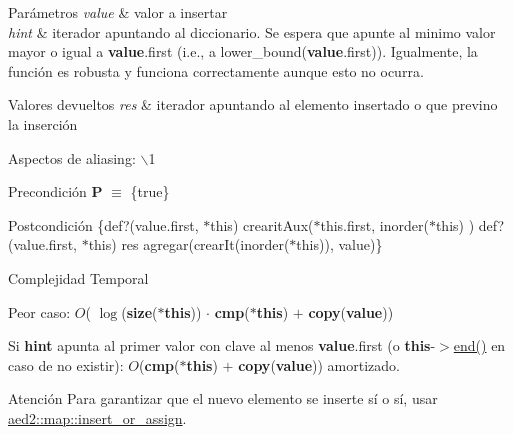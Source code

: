 \begin{DoxyParams}{\-Parámetros}
{\em value} & valor a insertar \\
\hline
{\em hint} & iterador apuntando al diccionario. \-Se espera que apunte al minimo valor mayor o igual a {\bfseries value}.first (i.\-e., a lower\-\_\-bound({\bfseries value}.first)). \-Igualmente, la función es robusta y funciona correctamente aunque esto no ocurra. \\
\hline
\end{DoxyParams}

\begin{DoxyRetVals}{\-Valores devueltos}
{\em res} & iterador apuntando al elemento insertado o que previno la inserción\\
\hline
\end{DoxyRetVals}
\begin{DoxyParagraph}{\-Aspectos de aliasing\-:}
$\backslash$1
\end{DoxyParagraph}
\begin{DoxyPrecond}{\-Precondición}
{\bfseries \-P} $\equiv$ \{true\} 
\end{DoxyPrecond}
\begin{DoxyPostcond}{\-Postcondición}
\{def?(value.\-first, $\ast$this)  crearit\-Aux($\ast$this.first, inorder($\ast$this) )   def?(value.\-first, $\ast$this)  res  agregar(crear\-It(inorder($\ast$this)), value)\}
\end{DoxyPostcond}

\begin{DoxyDescription}
\item[\-Complejidad \-Temporal]
\begin{DoxyItemize}
\item \-Peor caso\-: $O$( $\log$({\bfseries size}({\bfseries $\ast$this})) $\cdot$ {\bfseries cmp}({\bfseries $\ast$this}) $+$ {\bfseries copy}({\bfseries value}))
\item \-Si {\bfseries hint} apunta al primer valor con clave al menos {\bfseries value}.first (o {\bfseries this}-\/$>$\hyperlink{classaed2_1_1iterator_a67caf9468be999e9be96b7add5d79946_a67caf9468be999e9be96b7add5d79946}{end()} en caso de no existir)\-: $O$({\bfseries cmp}({\bfseries $\ast$this}) $+$ {\bfseries copy}({\bfseries value})) amortizado. 
\end{DoxyItemize}
\end{DoxyDescription}

\begin{DoxyAttention}{\-Atención}
\-Para garantizar que el nuevo elemento se inserte sí o sí, usar \hyperlink{classaed2_1_1map_a2ef6723c183916276b0afc4a4c721475_a2ef6723c183916276b0afc4a4c721475}{aed2\-::map\-::insert\-\_\-or\-\_\-assign}. 
\end{DoxyAttention}


